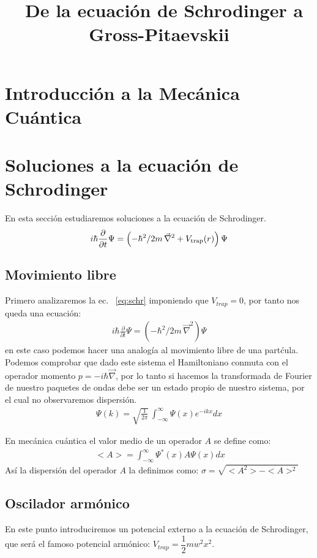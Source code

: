 \documentclass[12pt]{article}
\title{\ De la ecuaci\'on de Schrodinger a Gross-Pitaevskii}
\date{}
\begin{document}
\maketitle 
\section{Introducci\'on a la Mec\'anica Cu\'antica}
\section{Soluciones a la ecuaci\'on de Schrodinger}
En esta secci\'on estudiaremos soluciones a la ecuación de Schrodinger.
\begin{align}
i\hbar\frac{\partial}{\partial t}
\Psi =\left(-\hbar^2/2m \,\vec{\nabla}^2+V_{\rm trap}(r) 
\right)\Psi
\label{eq:schr}
\end{align}
\subsection{Movimiento libre}
Primero analizaremos la ec. ~\eqref{eq:schr} imponiendo que $V_{trap}=0$, por tanto nos queda una ecuaci\'on:
\begin{align}
i\hbar\frac{\partial}{\partial t}
\Psi =\left(-\hbar^2/2m \,\vec{\nabla}^2 
\right)\Psi
\label{eq:schr_free}
\end{align}
 en este caso podemos hacer una analog\'ia al movimiento libre de una part\'cula. Podemos comprobar que dado este sistema el Hamiltoniano conmuta con el operador momento $p=-i\hbar\vec{\nabla}$, por lo tanto si hacemos la transformada de Fourier de nuestro paquetes de ondas debe ser un estado propio de nuestro sistema, por el cual no observaremos dispersi\'on.
 \begin{align}
 \Psi(k) =\sqrt{\frac{1}{2\pi}} \,\int_{-\infty}^{\infty}\Psi(x)e^{-ikx}dx
 \label{eq:four}
 \end{align}
 
 En mec\'anica cu\'antica el valor medio de un operador $A$ se define como:
 \begin{align}
 \ <A>=\int_{-\infty}^{\infty}\Psi^{*}(x)A\Psi(x) dx
 \label{eq:mean}
 \end{align}
 As\'i la dispersi\'on del operador $A$ la definimos como: $ \sigma=\sqrt{<A^2>-<A>^2}  $
 \\
 
\subsection{Oscilador arm\'onico}
En este punto introduciremos un potencial externo a la ecuaci\'on de Schrodinger, que ser\'a el famoso potencial arm\'onico:  $V_{trap}=\dfrac{1}{2}mw^2x^2$.
\end{document}
